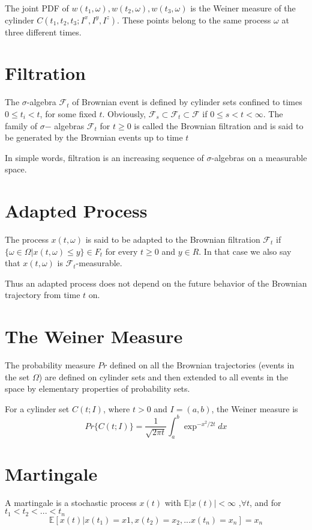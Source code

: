 \documentclass[12pt]{book}
\begin{document}
The joint PDF of $w(t_1,\omega),w(t_2,\omega),w(t_3,\omega)$ is the Weiner measure of the cylinder $C(t_1,t_2,t_3;I^x,I^y,I^z)$. These points belong to the same process $\omega$ at three different times. 

\section{Filtration}\label{section_filtration}
The $\sigma$-algebra $\mathcal{F}_t$ of Brownian event is defined by cylinder
sets confined to times $0\leq t_i < t$, for some fixed $t$. Obviously, $\mathcal{F}_s \subset \mathcal{F}_t \subset \mathcal{F}$ if $0\leq s < t <\infty$. The family of $\sigma$− algebras $\mathcal{F}_t$ for $t \geq 0$ is called the Brownian filtration and is said to be generated by the Brownian events up to time $t$

In simple words, filtration is an increasing sequence of $\sigma$-algebras on a measurable space. 

\section{Adapted Process}\label{section_adaptedProcess}
The process $x(t,\omega)$ is said to be adapted
to the Brownian filtration $\mathcal{F}_t$ if $\{\omega\in\Omega|x(t,\omega) \leq y\} \in F_t$ for every $t \geq 0$ and
$y\in R$. In that case we also say that $x(t, \omega)$ is $\mathcal{F}_t$-measurable.

Thus an adapted process does not depend on the future behavior of the Brownian trajectory from time $t$ on.

\section{The Weiner Measure}\label{section_theWeinerMeasure}
The probability measure $Pr$ defined on all the Brownian trajectories (events in the set $\Omega$) are defined on cylinder sets and then extended to all events in the space by elementary properties of probability sets.

For a cylinder set $C(t;I)$, where $t>0$ and $I=(a,b)$, the Weiner measure is 
\begin{equation*}
Pr\{C(t;I)\}=\frac{1}{\sqrt{2\pi t}}\int_a^b\exp^{-x^2/2t}dx
\end{equation*}

\section{Martingale}\label{section_martingale}
A martingale is a stochastic process $ x(t)$ with $\mathbb{E}|x(t)|<\infty$ ,$\forall t$, and for $t_1<t_2<...<t_n$
\begin{equation*}
\mathbb{E}[x(t)|x(t_1)=x1,x(t_2)=x_2,...x(t_n)=x_n]=x_n
\end{equation*}
\end{document}
